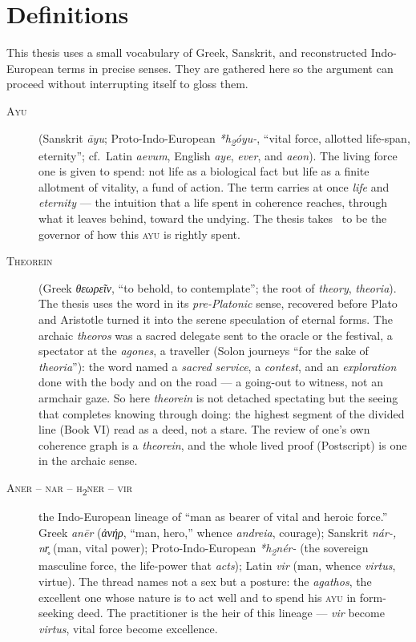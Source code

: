 \chapter*{Definitions}

\noindent This thesis uses a small vocabulary of Greek, Sanskrit, and
reconstructed Indo-European terms in precise senses. They are gathered here so the
argument can proceed without interrupting itself to gloss them.

\begin{description}

\item[\textsc{Ayu}] (Sanskrit \emph{āyu}; Proto-Indo-European \emph{*h\textsubscript{2}óyu-},
``vital force, allotted life-span, eternity''; cf.\ Latin \emph{aevum}, English
\emph{aye}, \emph{ever}, and \emph{aeon}). The living force one is given to spend:
not life as a biological fact but life as a finite allotment of vitality, a fund
of action. The term carries at once \emph{life} and \emph{eternity} --- the
intuition that a life spent in coherence reaches, through what it leaves behind,
toward the undying. The thesis takes \physis\ to be the governor of how this
\textsc{ayu} is rightly spent.

\item[\textsc{Theorein}] (Greek \emph{θεωρεῖν}, ``to behold, to contemplate''; the
root of \emph{theory}, \emph{theoria}). The thesis uses the word in its \emph{pre-Platonic}
sense, recovered before Plato and Aristotle turned it into the serene speculation of
eternal forms. The archaic \emph{theoros} was a sacred delegate sent to the oracle or
the festival, a spectator at the \emph{agones}, a traveller (Solon journeys ``for the
sake of \emph{theoria}''): the word named a \emph{sacred service}, a \emph{contest},
and an \emph{exploration} done with the body and on the road --- a going-out to witness,
not an armchair gaze. So here \emph{theorein} is not detached spectating but the seeing
that completes knowing through doing: the highest segment of the divided line (Book VI)
read as a deed, not a stare. The review of one's own coherence graph is a
\emph{theorein}, and the whole lived proof (Postscript) is one in the archaic sense.

\item[\textsc{Aner -- nar -- h\textsubscript{2}ner -- vir}] the Indo-European
lineage of ``man as bearer of vital and heroic force.'' Greek \emph{anēr}
(\emph{ἀνήρ}, ``man, hero,'' whence \emph{andreia}, courage); Sanskrit \emph{nár-,
nr̥} (man, vital power); Proto-Indo-European \emph{*h\textsubscript{2}nér-} (the
sovereign masculine force, the life-power that \emph{acts}); Latin \emph{vir}
(man, whence \emph{virtus}, virtue). The thread names not a sex but a posture: the
\emph{agathos}, the excellent one whose nature is to act well and to spend his
\textsc{ayu} in form-seeking deed. The practitioner is the heir of this lineage ---
\emph{vir} become \emph{virtus}, vital force become excellence.


\end{description}
